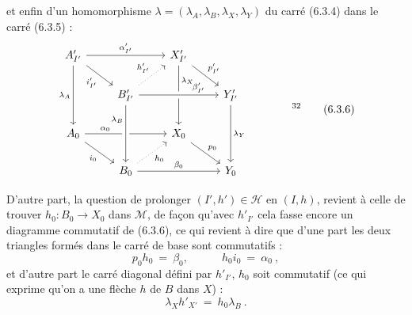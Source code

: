 et enfin d'un homomorphisme $\lambda = (\lambda_A, \lambda_B, \lambda_X, \lambda_Y)$ du carré (6.3.4) dans le carré (6.3.5) :
\[
\begin{tikzcd}
A'_{I'} \arrow[rr, "\alpha'_{I'}"] \arrow[dr, "i'_{I'}"'] \arrow[dd, "\lambda_A"'] & & X'_{I'} \arrow[dr, "p'_{I'}"] \arrow[dd, "\lambda_X" near start] & \\
 & B'_{I'} \arrow[ur, dotted, "h'_{I'}"] \arrow[rr, crossing over, "\beta'_{I'}" near end] & & Y'_{I'} \arrow[dd, "\lambda_Y"] \\
A_0 \arrow[rr, "\alpha_0" near start] \arrow[dr, "i_0"'] & & X_0 \arrow[dr, "p_0"] & \\
 & B_0 \arrow[from=2-2, crossing over, "\lambda_B"' near start] \arrow[ur, dotted, "h_0"'] \arrow[rr, "\beta_0"] & & Y_0
\end{tikzcd}
\qquad\qquad \text{\footnotemark[32]}
\tag*{(6.3.6)}
\]

D'autre part, la question de prolonger $(I', h') \in \mathcal{H}$ en $(I, h)$, revient à celle de trouver $h_0 : B_0 \longrightarrow X_0$ dans $\mathcal{M}$, de façon qu'avec $h'_{I'}$ cela fasse encore un diagramme commutatif de (6.3.6), ce qui revient à dire que d'une part les deux triangles formés dans le carré de base sont commutatifs :
\[
p_0h_0 \ =\ \beta_0, \qquad\quad h_0i_0 \ =\ \alpha_0\ ,
\tag*{(6.3.7)}
\]
et d'autre part le carré diagonal défini par $h'_{I'}$, $h_0$ soit commutatif (ce qui exprime qu'on a une flèche $h$ de $B$ dans $X$) :
\[
\lambda_X h'_{X'} \ =\ h_0\lambda_B\ . %
\tag*{(6.3.8)}
\]

